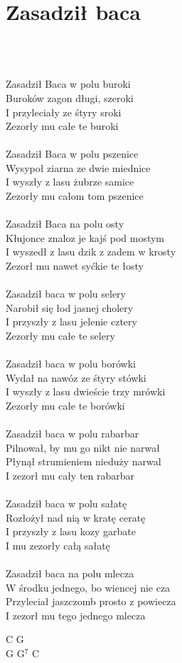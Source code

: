 \documentclass[a5paper, 10pt]{book}
\begin{document}
\newpage
\section{Zasadził baca}\textcolor{lightgray}{\textit{}}\\~\\
\begin{minipage}[t]{0.8\textwidth}
Zasadził Baca w polu buroki\\
Buroków zagon długi, szeroki\\
I przyleciały ze śtyry sroki\\
Zezorły mu całe te buroki\\
\\
Zasadził Baca w polu pszenice\\
Wysypoł ziarna ze dwie miednice\\
I wyszły z lasu żubrze samice\\
Zezorły mu całom tom pszenice\\
\\
Zasadził Baca na polu osty\\
Kłujonce znaloz je kajś pod mostym\\
I wyszedł z lasu dzik z zadem w krosty\\
Zezorł mu nawet syćkie te łosty\\
\\
Zasadził baca w polu selery\\
Narobił się łod jasnej cholery\\
I przyszły z lasu jelenie cztery\\
Zezorły mu całe te selery\\
\\
Zasadził baca w polu borówki\\
Wydał na nawóz ze śtyry stówki\\
I wyszły z lasu dwieście trzy mrówki\\
Zezorły mu całe te borówki\\
\\
Zasadził baca w polu rabarbar\\
Pilnował, by mu go nikt nie narwał\\
Płynął strumieniem nieduży narwal\\
I zezorł mu cały ten rabarbar\\
\\
Zasadził baca w polu sałatę\\
Rozłożył nad nią w kratę ceratę\\
I przyszły z lasu kozy garbate\\
I mu zezorły całą sałatę\\
\\
Zasadził baca na polu mlecza\\
W środku jednego, bo wiencej nie cza\\
Przyleciał jaszczomb prosto z powiecza\\
I zezorł mu tego jednego mlecza\\

\end{minipage}
\begin{minipage}[t]{0.2\textwidth}
C G\\
G G$^7$ C\\
\end{minipage}
\end{document}
